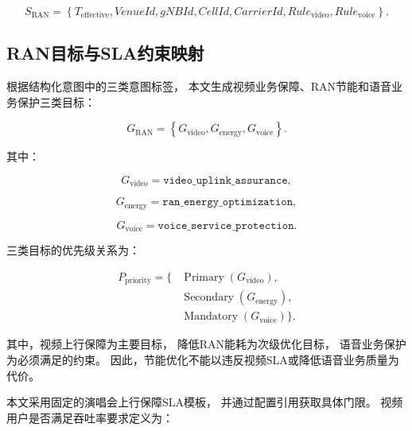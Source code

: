 \documentclass[lang=cn,12pt]{elegantbook}
\begin{document}
\begin{equation}
S_{\mathrm{RAN}}
=
\left\{
T_{\mathrm{effective}},
VenueId,
gNBId,
CellId,
CarrierId,
Rule_{\mathrm{video}},
Rule_{\mathrm{voice}}
\right\}.
\label{eq:ran_scope_result}
\end{equation}


\subsection*{RAN目标与SLA约束映射}

根据结构化意图中的三类意图标签，
本文生成视频业务保障、RAN节能和语音业务保护三类目标：

\begin{equation}
G_{\mathrm{RAN}}
=
\left\{
G_{\mathrm{video}},
G_{\mathrm{energy}},
G_{\mathrm{voice}}
\right\}.
\label{eq:translated_ran_objectives}
\end{equation}

其中：

\begin{equation}
G_{\mathrm{video}}
=
\texttt{video\_uplink\_assurance},
\label{eq:video_assurance_objective}
\end{equation}

\begin{equation}
G_{\mathrm{energy}}
=
\texttt{ran\_energy\_optimization},
\label{eq:energy_optimization_objective}
\end{equation}

\begin{equation}
G_{\mathrm{voice}}
=
\texttt{voice\_service\_protection}.
\label{eq:voice_protection_objective}
\end{equation}

三类目标的优先级关系为：

\begin{equation}
\begin{aligned}
P_{\mathrm{priority}}
=
\{
&\operatorname{Primary}
(G_{\mathrm{video}}),
\\
&\operatorname{Secondary}
(G_{\mathrm{energy}}),
\\
&\operatorname{Mandatory}
(G_{\mathrm{voice}})
\}.
\end{aligned}
\label{eq:translated_objective_priority}
\end{equation}

其中，视频上行保障为主要目标，
降低RAN能耗为次级优化目标，
语音业务保护为必须满足的约束。
因此，节能优化不能以违反视频SLA或降低语音业务质量为代价。

本文采用固定的演唱会上行保障SLA模板，
并通过配置引用获取具体门限。
视频用户是否满足吞吐率要求定义为：
\end{document}
